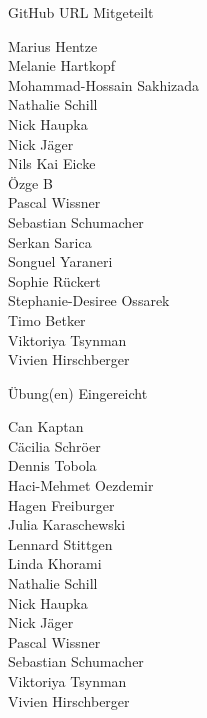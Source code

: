 \documentclass{beamer}
\begin{document}
\begin{frame}{GitHub URL Mitgeteilt}
\begin{minipage}[t]{0.30\linewidth}
			Marius Hentze \\
			Melanie Hartkopf\\
			Mohammad-Hossain Sakhizada\\
			Nathalie Schill\\
			Nick Haupka\\
			Nick Jäger\\
			Nils Kai Eicke\\
			Özge B\\
			Pascal Wissner\\
			Sebastian Schumacher\\
			Serkan Sarica\\
			Songuel Yaraneri\\
			Sophie Rückert\\
			Stephanie-Desiree Ossarek\\
			Timo Betker\\
			Viktoriya Tsynman\\
			Vivien Hirschberger\\
		\end{minipage}
	
\end{frame}

\begin{frame}{Übung(en) Eingereicht}
	
	\fboxsep=0pt
	\noindent%
	\begin{minipage}[t]{0.48\linewidth}
		Can Kaptan \\
		Cäcilia Schröer \\
		Dennis Tobola \\
		Haci-Mehmet Oezdemir \\
		Hagen Freiburger \\
		Julia Karaschewski \\
		Lennard Stittgen \\
		Linda Khorami \\
		Nathalie Schill \\
		Nick Haupka \\
		Nick Jäger \\
		Pascal Wissner \\
		Sebastian Schumacher \\
		Viktoriya Tsynman \\
		Vivien Hirschberger
	\end{minipage}%
	
\end{frame}
\end{document}

